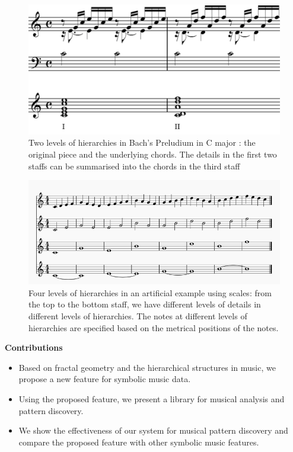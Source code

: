 \begin{figure}
  \includegraphics[width=\linewidth]{src/img/eg.png}
  \caption{Two levels of hierarchies in Bach's Preludium in C major \cite{wiki:bach}: the original piece and the underlying chords.
          The details in the first two staffs can be summarised into the chords in the third staff}
  \label{fig:egbach}
\end{figure}

\begin{figure}
  \includegraphics[width=\linewidth]{src/img/egscale.png}
  \caption{Four levels of hierarchies in an artificial example using scales: from the top to the bottom staff, we have different levels of details in different levels of hierarchies.
    The notes at different levels of hierarchies are specified based on the metrical positions of the notes.}
  \label{fig:egscale}
\end{figure}

\textbf{Contributions}
\begin{itemize}
\item  Based on fractal geometry and the hierarchical structures in music, we propose a new feature for symbolic music data.
\item  Using the proposed feature, we present a library for musical analysis and pattern discovery.
\item  We show the effectiveness of our system for musical pattern discovery and compare the proposed feature with other symbolic music features. 
\end{itemize}


